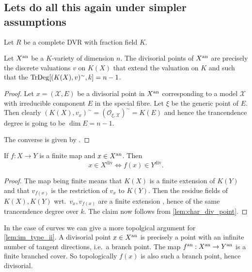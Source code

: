 \subsection{Lets do all this again under simpler assumptions} \label{sec:lets_do_all_this_again_under_simpler_assumptions}

Let $R$ be a complete DVR with fraction field $K$. 

\begin{lemma}\label{lem:char_div_point}
	Let $X{}^{\text{an}}$ be a $K$-variety of dimension $n$. 
	The divisorial points of $X{}^{\text{an}}$ are precisely the discrete valuations $v$ on $K(X)$ that extend the valuation on $K$ and such that the $\operatorname{TrDeg} [(K(X),v)^{\sim}, k] = n-1$.
\end{lemma}
\begin{proof}
	Let $x = (\mathscr X, E)$ be a divisorial point in $X{}^{\text{an}}$ corresponding to a model $\mathscr X$ with irreducible component $E$ in the special fibre.
	Let $\xi$ be the generic point of $E$. 
	Then clearly $(K(X), v_x)^{\sim} = (\mathcal{O}_{\xi, \mathscr X})^{\sim} = K(E)$ and hence the trancendence degree is going to be  $\dim E = n-1$.

	The converse is given by \cite[lem 2.45]{kollarBirationalGeometryAlgebraic1998}. 
\end{proof}
\begin{lemma}\label{lem:im_type_ii}
	If $f: X \to Y$ is a finite map and $x \in X{}^{\text{an}}$. Then
	\[
		x \in X^\text{div} \iff f(x) \in Y^\text{div}
	.\] 
\end{lemma}
\begin{proof}
	The map being finite means that $K(X)$ is a finite extension of $K(Y)$ and that $v_{f(x)}$ is the restriction of $v_x$ to $K(Y)$. 
	Then the residue fields of $K(X), K(Y)$ wrt.\ $v_x, v_{f(x)}$ are a finite extension , hence of the same trancendence degree over $k$. 
	The claim now follows from \cref{lem:char_div_point}.
\end{proof}
\begin{remark}
	In the case of curves we can give a more topolgical argument for \cref{lem:im_type_ii}. 
	A divisorial point $x \in X{}^{\text{an}}$ is precisely a point with an infinite number of tangent directions, i.e.\ a branch point.
	The map $f{}^{\text{an}}: X{}^{\text{an}} \to Y{}^{\text{an}} $ is a finite branched cover. So topologically $f(x)$ is also such a branch point, hence divisorial. 	
\end{remark}

